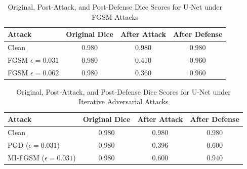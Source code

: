 \documentclass[conference]{IEEEtran}
\begin{document}
\begin{table}[H]
\centering
\footnotesize
\caption{Original, Post‑Attack, and Post‑Defense Dice Scores for U‑Net under FGSM Attacks}
\label{tab:unet_fgsm_defense_comparison}
\begin{tabular}{@{\hspace{0.3cm}}l
                S[table-format=1.3]
                S[table-format=1.3]
                S[table-format=1.3]@{\hspace{0.3cm}}}
  \toprule
  \textbf{Attack} 
    & {\textbf{Original Dice}} 
    & {\textbf{After Attack}} 
    & {\textbf{After Defense}} \\
  \midrule
  Clean                                 & 0.980 & 0.980 & 0.980 \\
  FGSM $\epsilon=0.031$                 & 0.980 & 0.410 & 0.960 \\
  FGSM $\epsilon=0.062$                 & 0.980 & 0.360 & 0.960 \\
  \bottomrule
\end{tabular}
\end{table}


\begin{table}[H]
\centering
\footnotesize
\caption{Original, Post‑Attack, and Post‑Defense Dice Scores for U‑Net under Iterative Adversarial Attacks}
\label{tab:unet_iterative_defense_comparison}
\begin{tabular}{@{\hspace{0.3cm}}l
                S[table-format=1.3]
                S[table-format=1.3]
                S[table-format=1.3]@{\hspace{0.3cm}}}
  \toprule
  \textbf{Attack}
    & {\textbf{Original Dice}}
    & {\textbf{After Attack}}
    & {\textbf{After Defense}} \\
  \midrule
  Clean                      
    & 0.980 & 0.980 & 0.980 \\
  PGD ($\epsilon=0.031$)     
    & 0.980 & 0.396 & 0.600 \\
  MI‑FGSM ($\epsilon=0.031$) 
    & 0.980 & 0.600 & 0.940 \\
  \bottomrule
\end{tabular}
\end{table}
\end{document}
